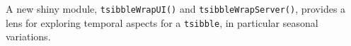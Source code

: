 A new shiny module, \texttt{tsibbleWrapUI()} and
\texttt{tsibbleWrapServer()}, provides a lens for exploring temporal
aspects for a \texttt{tsibble}, in particular seasonal variations.



\address{%
Earo Wang\\
The University of Auckland\\%
Department of Statistics\\
%
%
%
\\\href{mailto:earo.wang@auckland.ac.nz}{\nolinkurl{earo.wang@auckland.ac.nz}}
}

\address{%
Dianne Cook\\
Monash University\\%
Department of Econometrics and Business Statistics\\
%
%
%
\\\href{mailto:dicook@monash.edu}{\nolinkurl{dicook@monash.edu}}
}
